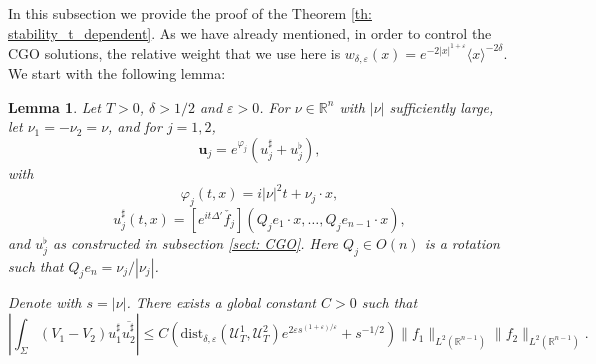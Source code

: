\documentclass[10pt,a4paper]{amsart}
\newtheorem{lemma}[proposition]{Lemma}
\theoremstyle{remark}
\theoremstyle{definition}
\newcommand{\R}{\mathbb{R}}
\newcommand{\dist}{\mathrm{dist}}
\def\ve{\varepsilon}
\def\cal{\mathcal}
\def\ovl{\overline}
\begin{document}
In this subsection we provide the proof of the Theorem \ref{th: stability_t_dependent}. As we have already mentioned, in order to control the CGO solutions, the relative weight that we use here is $w_{\delta, \ve}(x)=e^{-2|x|^{1+\ve}} \langle x \rangle^{-2 \delta}$. 
%
%
We start with the following lemma:
%
\begin{lemma}\label{lem: stability_tDep_1}
	Let $T>0$,  $\delta>1/2$ and $\ve>0$. For $\nu\in\R^n$ with $|\nu|$ sufficiently large, let $\nu_1=-\nu_2=\nu$, and for $j=1,2$,
	\[
	\mathbf{u}_j=e^{\varphi_j}(u_j^\sharp+u_j^\flat),
	\]
	with 
	\[
	\varphi_j(t,x)=i|\nu|^2t+\nu_j\cdot x,
	\] 
	\[
u_j^\sharp(t,x)=[e^{it\Delta'}\check {f_j}](Q_je_1\cdot x,\ldots, Q_je_{n-1}\cdot x),
        \]
and $u_j^\flat$ as constructed in subsection \ref{sect: CGO}. Here $Q_j\in O(n)$ is a rotation such that $Q_je_n=\nu_j/|\nu_j|$.

Denote with $s=|\nu|$. There exists a global constant $C>0$ such that
%
\begin{equation}\label{eq: stability_tDep_1}
\left|\int_{\Sigma} (V_1-V_2)u^\sharp_1\ovl{u^\sharp_2}\right| \leq C \left(\dist_{\delta,\ve}(\cal{U}_T^1, \cal{U}_T^2)e^{2\ve s^{(1+\ve)/\ve}}+s^{-1/2}\right)\|f_1\|_{L^2(\R^{n-1})} \|f_2\|_{L^2(\R^{n-1})}.
\end{equation}
%
\end{lemma}
% 
\end{document}

